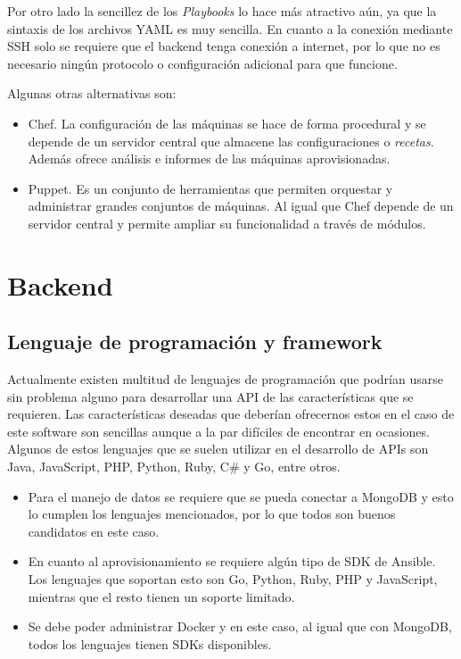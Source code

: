 Por otro lado la sencillez de los \textit{Playbooks} lo hace más atractivo aún, ya que la sintaxis de los archivos YAML  es muy sencilla. En cuanto a la conexión mediante SSH solo se requiere que el backend tenga conexión a internet, por lo que no es necesario ningún protocolo o configuración adicional para que funcione.

Algunas otras alternativas son:
\begin{itemize}
	\item Chef. La configuración de las máquinas se hace de forma procedural y se depende de un servidor central que almacene las configuraciones o \textit{recetas}. Además ofrece análisis e informes de las máquinas aprovisionadas.
	\item Puppet. Es un conjunto de herramientas que permiten orquestar y administrar grandes conjuntos de máquinas. Al igual que Chef depende de un servidor central y permite ampliar su funcionalidad a través de módulos.
\end{itemize}



\section{Backend}

\subsection{Lenguaje de programación y framework}

Actualmente existen multitud de lenguajes de programación que podrían usarse sin problema alguno para desarrollar una API de las características que se requieren. Las características deseadas que deberían ofrecernos estos en el caso de este software son sencillas aunque a la par difíciles de encontrar en ocasiones. Algunos de estos lenguajes que se suelen utilizar en el desarrollo de APIs son Java, JavaScript, PHP, Python, Ruby, C\# y Go, entre otros.

\begin{itemize}
	\item Para el manejo de datos se requiere que se pueda conectar a MongoDB y esto lo cumplen los lenguajes mencionados, por lo que todos son buenos candidatos en este caso.
	\item En cuanto al aprovisionamiento se requiere algún tipo de SDK de Ansible. Los lenguajes que soportan esto son Go, Python, Ruby, PHP y JavaScript, mientras que el resto tienen un soporte limitado.
	\item Se debe poder administrar Docker y en este caso, al igual que con MongoDB, todos los lenguajes tienen SDKs disponibles.
\end{itemize}

